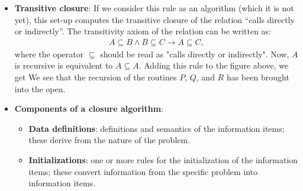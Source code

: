 \documentclass{report}
\begin{document}
\begin{itemize}
            \bigbreak \noindent 
            The initial calling graph is, however, of little immediate use since we are mainly interested in which routine calls which other routine directly or indirectly. For example, recursion may involve call chains from A to B to C back to A. To find these additional information items, we apply the following rule to the graph: If there is an arrow from node $A$ to node $B$ and one from $B$ to $C$, make sure there is an arrow from $A$ to $C$.
            \bigbreak \noindent 
            Consider the program
            \bigbreak \noindent 
            \begin{cppcode}
                void P(void) { ... Q(); ... S (); ... }
                void Q(void) { ... R(); ... T (); ... }
                void R(void) { ... P (); }
                void T(void) { ... }
                void S(void) { ... }
            \end{cppcode}
            \bigbreak \noindent 
            The calling graph is then
            \bigbreak \noindent 
        \item \textbf{Transitive closure}: If we consider this rule as an algorithm (which it is not yet), this set-up computes the transitive closure of the relation “calls directly or indirectly”. The transitivity axiom of the relation can be written as:
            \begin{align*}
                A \subseteq B \land B \subseteq C \rightarrow A \subseteq C
            ,\end{align*}
            where the operator $\subseteq$ should be read as "calls directly or indirectly". Now, $A$ is recursive is equivalent to $A \subseteq A$.
            \bigbreak \noindent 
            Adding this rule to the figure above, we get
            \bigbreak \noindent 
            \bigbreak \noindent 
            We see that the recursion of the routines $P$, $Q$, and $R$ has been brought into the open.
        \item \textbf{Components of a closure algorithm}: 
            \begin{itemize}
                \item \textbf{Data definitions}: definitions and semantics of the information items; these derive from the nature of the problem.
                \item \textbf{Initializations}: one or more rules for the initialization of the information items; these convert information from the specific problem into information items.

\end{itemize}
\end{itemize}
\end{document}
